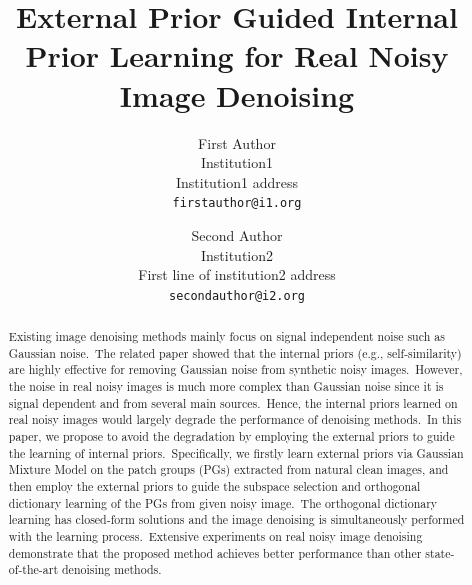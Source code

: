 \documentclass[10pt,twocolumn,letterpaper]{article}
\begin{document}
\title{External Prior Guided Internal Prior Learning for Real Noisy Image Denoising}

\author{First Author\\
Institution1\\
Institution1 address\\
{\tt\small firstauthor@i1.org}
\and
Second Author\\
Institution2\\
First line of institution2 address\\
{\tt\small secondauthor@i2.org}
}

\maketitle 


\begin{abstract}
Existing image denoising methods mainly focus on signal independent noise such as Gaussian noise.\ The related paper showed that the internal priors (e.g., self-similarity) are highly effective for removing Gaussian noise from synthetic noisy images.\ However, the noise in real noisy images is much more complex than Gaussian noise since it is signal dependent and from several main sources.\ Hence, the internal priors learned on real noisy images would largely degrade the performance of denoising methods.\ In this paper, we propose to avoid the degradation by employing the external priors to guide the learning of internal priors.\ Specifically, we firstly learn external priors via Gaussian Mixture Model on the patch groups (PGs) extracted from natural clean images, and then employ the external priors to guide the subspace selection and orthogonal dictionary learning of the PGs from given noisy image.\ The orthogonal dictionary learning has closed-form solutions and the image denoising is simultaneously performed with the learning process.\ Extensive experiments on real noisy image denoising demonstrate that the proposed method achieves better performance than other state-of-the-art denoising methods. 
\end{abstract}
\end{document}
